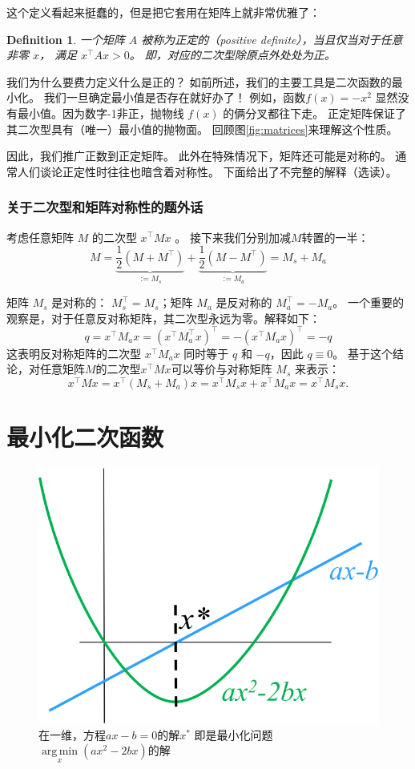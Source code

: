 \documentclass[notitlepage,oneside]{book}
\DeclareMathOperator*{\argmin}{arg\,min}
\newtheorem{definition}{Definition}
\begin{document}
这个定义看起来挺蠢的，但是把它套用在矩阵上就非常优雅了：

\begin{definition}
一个矩阵 $A$ 被称为正定的（positive definite），当且仅当对于任意非零 $x$，
满足 $x^\top A x > 0$。 即，对应的二次型除原点外处处为正。
\end{definition}

我们为什么要费力定义什么是正的？
如前所述，我们的主要工具是二次函数的最小化。
我们一旦确定最小值是否存在就好办了！
例如，函数$f(x) = - x^2$ 显然没有最小值。因为数字-1非正，抛物线 $f(x)$ 的俩分叉都往下走。
正定矩阵保证了其二次型具有（唯一）最小值的抛物面。
回顾图\ref{fig:matrices}来理解这个性质。

因此，我们推广正数到正定矩阵。
此外在特殊情况下，矩阵还可能是对称的。
通常人们谈论正定性时往往也暗含着对称性。
下面给出了不完整的解释（选读）。



\subsubsection{关于二次型和矩阵对称性的题外话}

考虑任意矩阵 $M$ 的二次型 $x^\top M x$ 。
接下来我们分别加减$M$转置的一半：
$$
M = \underbrace{\frac{1}{2} (M+M^\top)}_{:=M_s} + \underbrace{\frac{1}{2} (M-M^\top)}_{:=M_a} = M_s + M_a
$$

矩阵 $M_s$ 是对称的： $M_s^\top = M_s$；矩阵 $M_a$ 是反对称的 $M_a^\top=-M_a$。
一个重要的观察是，对于任意反对称矩阵，其二次型永远为零。解释如下：
$$
q = x^\top M_a x  = (x^\top M_a^\top x)^\top = - (x^\top M_a x)^\top = -q
$$
这表明反对称矩阵的二次型 $x^\top M_a x$ 同时等于 $q$ 和 $-q$，因此 $q\equiv 0$。
基于这个结论，对任意矩阵$M$的二次型$x^\top M x$可以等价与对称矩阵 $M_s$ 来表示：
$$
x^\top M x = x^\top (M_s + M_a) x = x^\top M_s x  + x^\top M_a x = x^\top M_s x.
$$


\section{最小化二次函数}

\begin{figure}[ht]
	\centering
	\includegraphics[width=.3\linewidth]{img/minpb1d}
	\caption{在一维，方程$ax - b = 0$的解$x^*$ 即是最小化问题$\argmin\limits_x(ax^2-2bx)$的解}
	\label{fig:min1d}
\end{figure}
\end{document}
